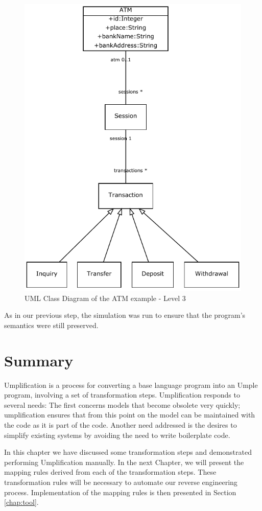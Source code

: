 \begin{figure}[!ht]
\centering
\includegraphics{Figures/Example2a3.pdf} 
\caption{UML Class Diagram of the ATM example - Level 3}
\label{fig:atmBanking3}
\end{figure}

As in our previous step, the simulation was run to ensure that the program's semantics were still preserved.


\section{Summary}

Umplification is a process for converting a base language program into an Umple program, involving a set of transformation steps. Umplification responds to several needs: The first concerns models that become obsolete very quickly; umplification ensures that from this point on the model can be maintained with the code as it is part of the code. Another need addressed is the desires to simplify existing systems by avoiding the need to write boilerplate code.

In this chapter we have discussed some transformation steps and demonstrated performing Umplification manually. In the next Chapter, we will present the mapping rules derived from each of the transformation steps. These transformation rules will be necessary to automate our reverse engineering process. Implementation of the mapping rules is then presented in Section \ref{chap:tool}.
